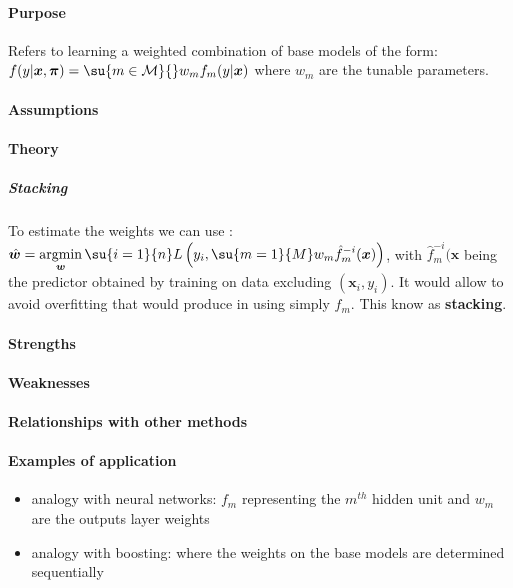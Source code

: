 \paragraph{Purpose}
Refers to learning a weighted combination of base models of the form:
$f(y|\bm{x},\bm{\pi}) = \su{m\in\mathcal{M}}{}w_{m}f_{m}(y|\bm{x})$ where $w_{m}$ are
the tunable parameters.
\paragraph{Assumptions}
\paragraph{Theory}
\subparagraph{Stacking}
To estimate the weights we can use : $\hat{\bm{w}} = \displaystyle\argmin_{\bm{
w}}\su{i=1}{n}L\left(y_{i},\su{m=1}{M}w_{m}\hat{f}_{m}^{-i}(\bm{x})\right)$, with 
$\hat{f}_{m}^{-i}(\bm{x}$ being the predictor obtained by training on data excluding
$(\bm{x}_{i},y_{i})$. It would allow to avoid overfitting that would produce in using
simply $f_{m}$. This know as \textbf{stacking}.
\paragraph{Strengths}
\paragraph{Weaknesses}
\paragraph{Relationships with other methods}
\paragraph{Examples of application}
\begin{itemize}
    \item analogy with neural networks: $f_{m}$ representing the $m^{th}$ hidden unit 
        and $w_{m}$ are the outputs layer weights
    \item analogy with boosting: where the weights on the base models are determined 
        sequentially
\end{itemize}



